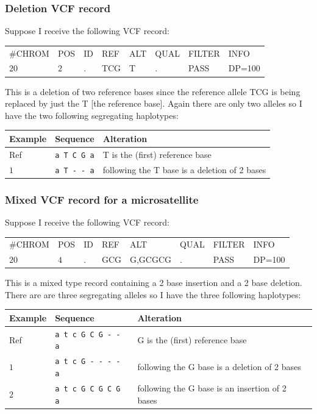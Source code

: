 \documentclass[8pt]{article}
\begin{document}
\subsubsection{Deletion VCF record}
Suppose I receive the following VCF record:

\vspace{0.3cm}
\begin{tabular}{ l l l l l l l l}
	\#CHROM & POS & ID & REF & ALT & QUAL & FILTER & INFO \\
	$20$ & $2$ & . & TCG & T & . & PASS & DP=100 \\
\end{tabular}
\vspace{0.3cm}

This is a deletion of two reference bases since the reference allele TCG is being replaced by just the T [the reference base].
Again there are only two alleles so I have the two following segregating haplotypes:

\vspace{0.3cm}
\begin{tabular}{ | l | l | l | }
\hline
Example & Sequence & Alteration \\ \hline
Ref & \verb|a T C G a| & T is the (first) reference base \\ \hline
$1$ & \verb|a T - - a| & following the T base is a deletion of 2 bases \\ \hline
\end{tabular}

\subsubsection{Mixed VCF record for a microsatellite}
Suppose I receive the following VCF record:

\vspace{0.3cm}
\begin{tabular}{ l l l l l l l l}
	\#CHROM & POS & ID & REF & ALT & QUAL & FILTER & INFO \\
	$20$ & $4$ & . & GCG & G,GCGCG & . & PASS & DP=100 \\
\end{tabular}
\vspace{0.3cm}

This is a mixed type record containing a 2 base insertion and a 2 base deletion.
There are are three segregating alleles so I have the three following haplotypes:

\vspace{0.3cm}
\begin{tabular}{ | l | l | l | }
\hline
Example & Sequence & Alteration \\ \hline
Ref & \verb|a t c G C G - - a| & G is the (first) reference base \\ \hline
$1$ & \verb|a t c G - - - - a| & following the G base is a deletion of 2 bases \\ \hline
$2$ & \verb|a t c G C G C G a| & following the G base is an insertion of 2 bases \\ \hline
\end{tabular}
\vspace{0.3cm}
\end{document}
